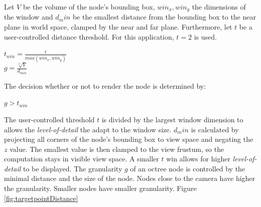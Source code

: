 Let $V$ be the volume of the node's bounding box, $win_x, win_y$ the dimensions of the window and $d_min$ be the smallest distance from the bounding box to the near plane in world space, clamped by the near and far plane. Furthermore, let $t$ be a user-controlled distance threshold. For this application, $t = 2$ is used. 

\begin{center}
$t_{win} = \frac{t}{max (win_x, win_y)}$ \\
$g = \frac{\sqrt[3]{V}}{d_{min}}$ \\
\end{center}
The decision whether or not to render the node is determined by:
\begin{center}
$g > t_{win}$
\end{center}

The user-controlled threshold $t$ is divided by the largest window dimension to allows the \textit{level-of-detail} the adapt to the window size. $d_min$ is calculated by projecting all corners of the node's bounding box to view space and negating the $z$ value. The smallest value is then clamped to the view frustum, so the computation stays in visible view space. A smaller $t$ win allows for higher \textit{level-of-detail} to be displayed. The granularity $g$ of an octree node is controlled by the minimal distance and the size of the node. Nodes close to the camera have higher the granularity. Smaller nodes have smaller granularity. Figure \ref{fig:targetpointDistance} 

